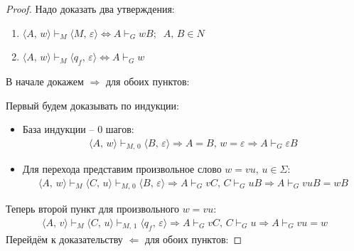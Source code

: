\documentclass[a4paper,12pt]{article}
\theoremstyle{plain}
\theoremstyle{definition}
\theoremstyle{remark}
\begin{document}
\begin{proof}
	Надо доказать два утверждения:
	\begin{enumerate}
		\item $\langle A,\, w\rangle \vdash_M \langle M,\, \varepsilon\rangle \Leftrightarrow A \vdash_G wB;\;\; A,\,B \in N$
		\item $\langle A,\, w\rangle \vdash_M \langle q_f,\, \varepsilon\rangle \Leftrightarrow A \vdash_G w$
	\end{enumerate}

	В начале докажем $\Rightarrow$ для обоих пунктов:

	Первый будем доказывать по индукции:
	\begin{itemize}
		\item База индукции -- 0 шагов:
		      \begin{align*}
			      \langle A,\, w\rangle \vdash_{M,\, 0} \langle B,\, \varepsilon\rangle \Rightarrow A = B,\, w = \varepsilon \Rightarrow A \vdash_G \varepsilon B
		      \end{align*}
		\item Для перехода представим произвольное слово $w = vu,\, u \in \Sigma$:
		      \begin{align*}
			      \langle A,\, w\rangle \vdash_M \langle C,\, u\rangle \vdash_{M,\,0} \langle B,\, \varepsilon\rangle \Rightarrow A \vdash_G vC,\, C \vdash_G uB \Rightarrow A \vdash_G vuB = wB
		      \end{align*}
	\end{itemize}
	Теперь второй пункт для произвольного $w = vu$:
	\begin{align*}
		\langle A,\, v\rangle \vdash_M \langle C,\, u\rangle \vdash_{M,\,1} \langle q_f,\, \varepsilon\rangle \Rightarrow A \vdash_G vC,\, C \vdash_G u \Rightarrow A \vdash_G vu = w
	\end{align*}
	Перейдём к доказательству $\Leftarrow$ для обоих пунктов:


\end{proof}
\end{document}
